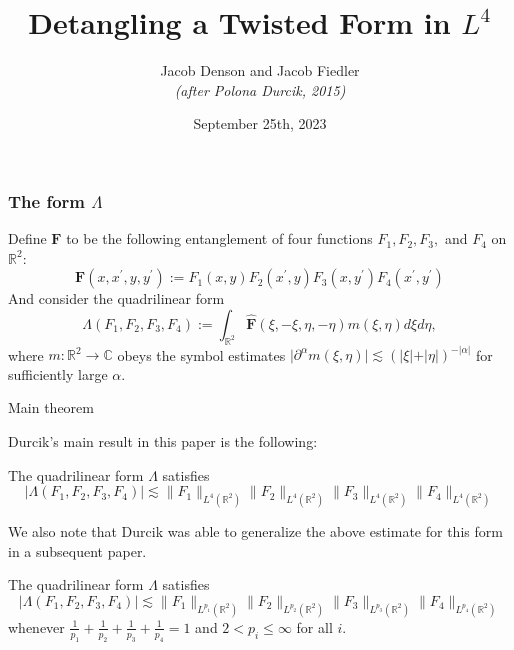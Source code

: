 \documentclass[usenames,dvipsnames,12pt]{beamer}
\title{Detangling a Twisted Form in $L^4$}
\author{Jacob Denson and Jacob Fiedler\\\emph{\small (after Polona Durcik, 2015)}}
\date{September 25th, 2023}
\institute{University of Wisconsin Madison}
\newcommand{\R}{\mathbb{R}}
\newcommand{\C}{\mathbb{C}}
\begin{document}
\maketitle

\begin{frame}
\frametitle{The form $\Lambda$}


Define $\mathbf{F}$ to be the following entanglement of four functions $F_1, F_2, F_3,$ and $F_4$ on $\R^2$:
%
\begin{equation*}\label{JDJFentangledproduct}
\mathbf{F}(x, x^\prime, y, y^\prime) := F_1(x, y)F_2(x^\prime, y)F_3(x, y^\prime)F_4(x^\prime, y^\prime)
\end{equation*}
%
\pause
And consider the quadrilinear form
%
\begin{equation*}\label{JDJFquadform}
\Lambda(F_1, F_2, F_3, F_4) := \int_{\R^2} \widehat{\mathbf{F}}(\xi, -\xi, \eta, -\eta) m(\xi, \eta) d\xi d\eta,
\end{equation*}
%
where $m: \R^2 \to \C$ obeys the symbol estimates $\vert \partial^\alpha m(\xi, \eta) \vert \lesssim (\vert\xi\vert + \vert\eta\vert)^{-\vert\alpha\vert}$ for sufficiently large $\alpha$.

\end{frame}

\begin{frame}{Main theorem}

Durcik's main result in this paper is the following:

\begin{theorem}\label{JDJFmaintheorem}
The quadrilinear form $\Lambda$ satisfies
\begin{equation*}\label{JDJFmainbound}
\vert\Lambda(F_1, F_2, F_3, F_4)\vert \lesssim \lVert F_1\rVert_{L^4(\mathbb{R}^2)}\lVert F_2\rVert_{L^4(\mathbb{R}^2)}\lVert F_3\rVert_{L^4(\mathbb{R}^2)}\lVert F_4\rVert_{L^4(\mathbb{R}^2)}
\end{equation*}
\end{theorem}
\pause
We also note that Durcik was able to generalize the above estimate for this form in a subsequent paper.

\begin{theorem}\label{Other Durcik}
The quadrilinear form $\Lambda$ satisfies
\begin{equation*}
\vert\Lambda(F_1, F_2, F_3, F_4)\vert \lesssim \lVert F_1\rVert _{L^{p_1}(\mathbb{R}^2)}\lVert F_2\rVert_{L^{p_2}(\mathbb{R}^2)}\lVert F_3\rVert_{L^{p_3}(\mathbb{R}^2)}\lVert F_4\rVert_{L^{p_4}(\mathbb{R}^2)}
\end{equation*}
whenever $\frac{1}{p_1} + \frac{1}{p_2} +\frac{1}{p_3} +\frac{1}{p_4} =1$ and $2<p_i\leq \infty$ for all $i$.
\end{theorem}

\end{frame}
\end{document}
